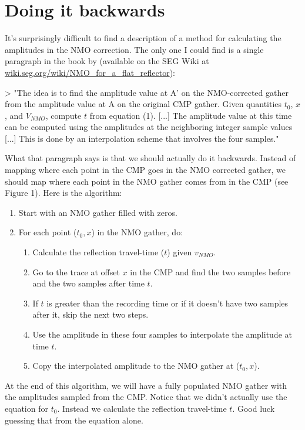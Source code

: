 \section{Doing it backwards}

It's surprisingly difficult to find a description of a method for calculating
the amplitudes in the NMO correction.
The only one I could find is a single paragraph in the book by
\citet{Yilmaz_2001} (available on the SEG Wiki at
\href{http://wiki.seg.org/wiki/NMO_for_a_flat_reflector}{wiki.seg.org/wiki/NMO\_for\_a\_flat\_reflector}):

> "The idea is to find the amplitude value at A' on the NMO-corrected gather from the amplitude value at A on the original CMP gather. Given quantities $t_0$, $x$, and $V_{NMO}$, compute $t$ from equation (1). [...] The amplitude value at this time can be computed using the amplitudes at the neighboring integer sample values [...] This is done by an interpolation scheme that involves the four samples."

What that paragraph says is that we should actually do it backwards.
Instead of mapping where each point in the CMP goes in the NMO corrected
gather, we should map where each point in the NMO gather comes from in the CMP
(see Figure 1).
Here is the algorithm:

\begin{enumerate}
    \item Start with an NMO gather filled with zeros.
    \item For each point ($t_0, x$) in the NMO gather, do:
    \begin{enumerate}
        \item Calculate the reflection travel-time ($t$) given $v_{NMO}$.
        \item Go to the trace at offset $x$ in the CMP and find the two samples
              before and the two samples after time $t$.
        \item If $t$ is greater than the recording time or if it doesn't have
              two samples after it, skip the next two steps.
        \item Use the amplitude in these four samples to interpolate the
              amplitude at time $t$.
        \item Copy the interpolated amplitude to the NMO gather at ($t_0, x$).
    \end{enumerate}
\end{enumerate}

At the end of this algorithm, we will have a fully populated NMO gather with
the amplitudes sampled from the CMP.
Notice that we didn't actually use the equation for $t_0$.
Instead we calculate the reflection travel-time $t$.
Good luck guessing that from the equation alone.
